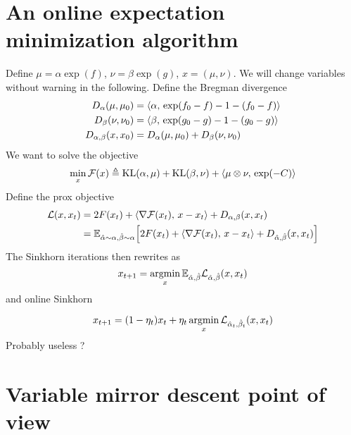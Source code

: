 \documentclass[a4paper, 10pt]{article}
\begin{document}
\section{An online expectation minimization algorithm}

Define $\mu = \alpha \exp(f)$, $\nu = \beta \exp(g)$, $x = (\mu, \nu)$. We will change variables without warning in the following.
Define the Bregman divergence
\begin{align}
    D_{\alpha}(\mu, \mu_0) &= \langle \alpha,\,\exp(f_0 - f) - 1 - (f_0 - f)\rangle \\
    D_{\beta}(\nu, \nu_0) &= \langle \beta,\,\exp(g_0 - g) - 1 - (g_0 - g)\rangle \\
    D_{\alpha, \beta}(x, x_0) &= D_{\alpha}(\mu, \mu_0) + D_{\beta}(\nu, \nu_0)
\end{align}
We want to solve the objective
\begin{equation}
    \min_x \mathcal{F}(x) \triangleq \text{KL}(\alpha, \mu) + \text{KL}(\beta, \nu) + \langle \mu \otimes \nu,\,\exp(-C)\rangle
\end{equation}
Define the prox objective
\begin{align}
    \mathcal{L}(x, x_t) &= 2 F(x_t) + \langle \nabla \mathcal{F}(x_t),\,x - x_t\rangle + D_{\alpha,\beta}(x, x_t) \\
    &= \mathbb{E}_{\hat \alpha \sim \alpha, \hat \beta \sim \alpha}
    \Big[2 F(x_t) + \langle \nabla \mathcal{F}(x_t),\,x - x_t\rangle + D_{\hat \alpha,\hat \beta}(x, x_t) \Big]
\end{align}
The Sinkhorn iterations then rewrites as
\begin{equation}
    x_{t+1} = \operatorname*{argmin}_x \mathbb{E}_{\hat \alpha, \hat \beta} \mathcal{L}_{\hat \alpha, \hat \beta}(x, x_t)
\end{equation}
and online Sinkhorn

\begin{equation}
    x_{t+1} = (1 - \eta_t) x_t + \eta_t \operatorname*{argmin}_x \mathcal{L}_{\hat \alpha_t, \hat \beta_t}(x, x_t)
\end{equation}
Probably useless ?

\section{Variable mirror descent point of view}
\end{document}
